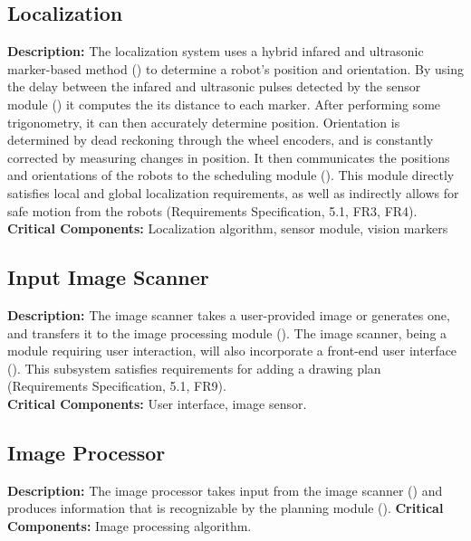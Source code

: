 \subsection{Localization}
\label{sec:subsystem_localization}
\textbf{Description:} The localization system uses a hybrid infared and ultrasonic marker-based method () to determine a robot's position and orientation. By using the delay between the infared and ultrasonic pulses detected by the sensor module () it computes the its distance to each marker. After performing some trigonometry, it can then accurately determine position. Orientation is determined by dead reckoning through the wheel encoders, and is constantly corrected by measuring changes in position. It then communicates the positions and orientations of the robots to the scheduling module (). This module directly satisfies local and global localization requirements, as well as indirectly allows for safe motion from the robots (Requirements Specification, 5.1, FR3, FR4).
\textbf{Critical Components:} Localization algorithm, sensor module, vision markers

\subsection{Input Image Scanner}
\label{sec:subsystem_input_scanner}
\textbf{Description:} The image scanner takes a user-provided image or generates one, and transfers it to the image processing module (). The image scanner, being a module requiring user interaction, will also incorporate a front-end user interface (). This subsystem satisfies requirements for adding a drawing plan (Requirements Specification, 5.1, FR9).\\
\textbf{Critical Components:} User interface, image sensor.\\

\subsection{Image Processor}
\label{sec:subsystem_image_processor}
\textbf{Description:} The image processor takes input from the image scanner () and produces information that is recognizable by the planning module (). 
\textbf{Critical Components:} Image processing algorithm.

